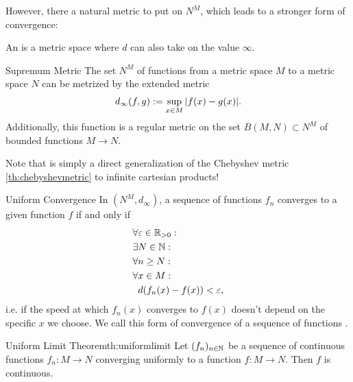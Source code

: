 However, there  a natural metric to put on $N^M$, which leads to a stronger form of convergence:
\begin{definition}
	An  is a metric space where $d$ can also take on the value $\infty$. 
\end{definition}
\begin{importanttheorem}{Supremum Metric}{}
	The set $N^M$ of functions from a metric space $M$ to a metric space $N$ can be metrized by the extended metric
	\begin{align*}
		d_\infty(f, g) := \sup_{x \in M} \abs{f(x) - g(x)}.
	\end{align*}
	Additionally, this function is a regular metric on the set $B(M,N) \subset N^M$ of bounded functions $M \to N$.
\end{importanttheorem}
Note that is simply a direct generalization of the Chebyshev metric \ref{th:chebyshevmetric} to infinite cartesian products!
\begin{importanttheorem}{Uniform Convergence}{}
	In $(N^M, d_\infty)$, a sequence of functions $f_n$ converges to a given function $f$ if and only if
	\begin{align*}
		\forall &\varepsilon \in \mathbb{R}_{> 0}:\\
		\exists & N \in \mathbb{N} :\\
		\forall & n \geq N:\\
		\forall & x \in M:\\
		&d(f_n(x) - f(x)) < \varepsilon,
	\end{align*}
	i.e. if the speed at which $f_n(x)$ converges to $f(x)$ doesn't depend on the specific $x$ we choose.
	We call this form of convergence of a sequence of functions .
\end{importanttheorem}
\begin{importanttheorem}{Uniform Limit Theorem}{th:uniformlimit}
	Let $(f_n)_{n \in \mathbb{N}}$ be a sequence of continuous functions $f_n : M \to N$ converging uniformly to a function $f : M \to N$. Then $f$ is continuous.
\end{importanttheorem}
